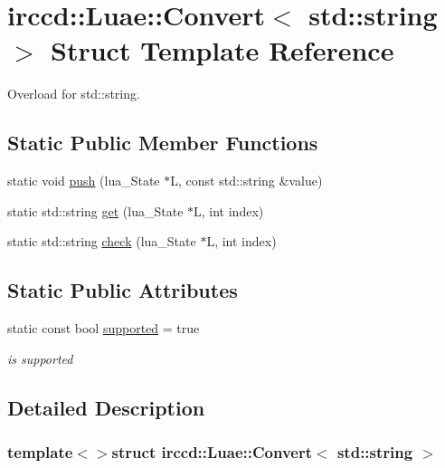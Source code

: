 \hypertarget{a00015}{\section{irccd\-:\-:Luae\-:\-:Convert$<$ std\-:\-:string $>$ Struct Template Reference}
\label{a00015}
}


Overload for std\-::string.  


\subsection*{Static Public Member Functions}
\begin{DoxyCompactItemize}
\item 
static void \hyperlink{a00015_a92a04972c1fc7de961e5cb9c802504d3}{push} (lua\-\_\-\-State $\ast$L, const std\-::string \&value)
\item 
static std\-::string \hyperlink{a00015_a60b6874671a29cbc8febb5f806d15ff2}{get} (lua\-\_\-\-State $\ast$L, int index)
\item 
static std\-::string \hyperlink{a00015_a5f61a0f04a9f900933ec7a21f86cc900}{check} (lua\-\_\-\-State $\ast$L, int index)
\end{DoxyCompactItemize}
\subsection*{Static Public Attributes}
\begin{DoxyCompactItemize}
\item 
\hypertarget{a00015_a6d1afe13c1a04c5c56168c30ea4dd9e5}{static const bool \hyperlink{a00015_a6d1afe13c1a04c5c56168c30ea4dd9e5}{supported} = true}\label{a00015_a6d1afe13c1a04c5c56168c30ea4dd9e5}

\begin{DoxyCompactList}\small\item\em is supported \end{DoxyCompactList}\end{DoxyCompactItemize}


\subsection{Detailed Description}
\subsubsection*{template$<$$>$struct irccd\-::\-Luae\-::\-Convert$<$ std\-::string $>$}

